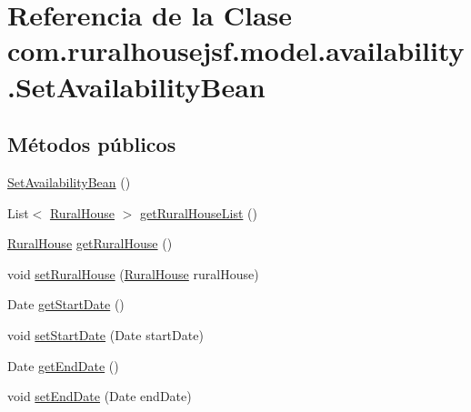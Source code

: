 \hypertarget{classcom_1_1ruralhousejsf_1_1model_1_1availability_1_1_set_availability_bean}{}\section{Referencia de la Clase com.\+ruralhousejsf.\+model.\+availability.\+Set\+Availability\+Bean}
\label{classcom_1_1ruralhousejsf_1_1model_1_1availability_1_1_set_availability_bean}
\subsection*{Métodos públicos}
\begin{DoxyCompactItemize}
\item 
\mbox{\hyperlink{classcom_1_1ruralhousejsf_1_1model_1_1availability_1_1_set_availability_bean_a5eb9c427878e584a4850a8f48fcdbdb7}{Set\+Availability\+Bean}} ()
\item 
List$<$ \mbox{\hyperlink{classcom_1_1ruralhousejsf_1_1domain_1_1_rural_house}{Rural\+House}} $>$ \mbox{\hyperlink{classcom_1_1ruralhousejsf_1_1model_1_1availability_1_1_set_availability_bean_ad3d70e71d8eef84be13608ebdc45daa0}{get\+Rural\+House\+List}} ()
\item 
\mbox{\hyperlink{classcom_1_1ruralhousejsf_1_1domain_1_1_rural_house}{Rural\+House}} \mbox{\hyperlink{classcom_1_1ruralhousejsf_1_1model_1_1availability_1_1_set_availability_bean_a6fc1e11639074a665cb2413b6e873004}{get\+Rural\+House}} ()
\item 
void \mbox{\hyperlink{classcom_1_1ruralhousejsf_1_1model_1_1availability_1_1_set_availability_bean_ac299020c526a3c4332cbd4e40b663b40}{set\+Rural\+House}} (\mbox{\hyperlink{classcom_1_1ruralhousejsf_1_1domain_1_1_rural_house}{Rural\+House}} rural\+House)
\item 
Date \mbox{\hyperlink{classcom_1_1ruralhousejsf_1_1model_1_1availability_1_1_set_availability_bean_a6da0cc3c2b9f138bb14fe20706b1d61d}{get\+Start\+Date}} ()
\item 
void \mbox{\hyperlink{classcom_1_1ruralhousejsf_1_1model_1_1availability_1_1_set_availability_bean_a13be2b2f3e792278e1b1b45cdc3c2286}{set\+Start\+Date}} (Date start\+Date)
\item 
Date \mbox{\hyperlink{classcom_1_1ruralhousejsf_1_1model_1_1availability_1_1_set_availability_bean_a6a42faf50c5cf766285bf4018c19d477}{get\+End\+Date}} ()
\item 
void \mbox{\hyperlink{classcom_1_1ruralhousejsf_1_1model_1_1availability_1_1_set_availability_bean_a29c747d6a871c8c0f1eb3806461b1d32}{set\+End\+Date}} (Date end\+Date)

\end{DoxyCompactItemize}
